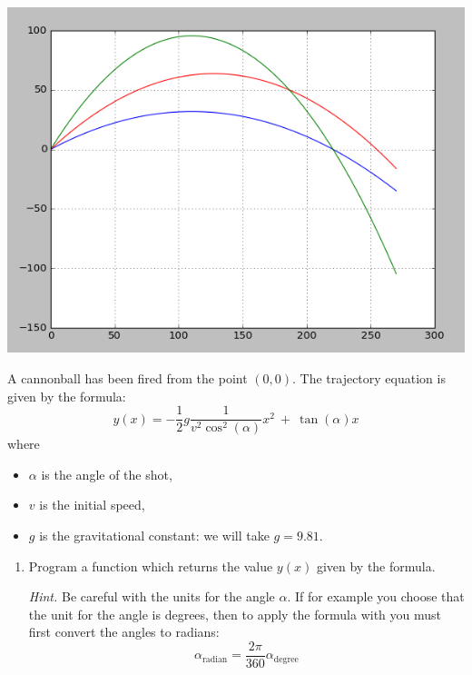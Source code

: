 \documentclass[11pt,class=report,crop=false]{standalone}
\begin{document}
\begin{activite}[Ballistics]



\begin{center}
\includegraphics[scale=\myscale,scale=0.45]{screen-lists-I-tir-bis}
\end{center}

A cannonball has been fired from the point $(0,0)$. The trajectory equation is given by the formula:
$$y(x) = -\frac12  g \frac{1}{v^2 \cos^2(\alpha)} x^2 \  + \   \tan (\alpha)  x$$
where
\begin{itemize}
  \item $\alpha$ is the angle of the shot,
  \item $v$ is the initial speed,
  \item $g$ is the gravitational constant: we will take $g = 9.81$.
\end{itemize}


\begin{enumerate}
  \item Program a  function
  which returns the value $y(x)$ given by the formula.
  
  \emph{Hint.} Be careful with the units for the angle $\alpha$. If for example you choose that the unit for the angle is degrees, then to apply the formula with \Python{} you must first convert the angles to radians:
  $$\alpha_{\text{radian}} = \frac{2\pi}{360} \alpha_{\text{degree}}$$
  

\end{enumerate}
\end{activite}
\end{document}
